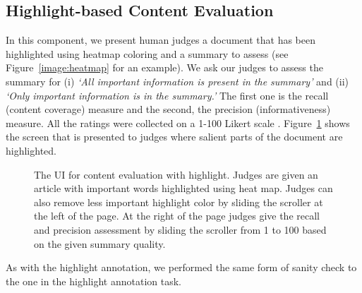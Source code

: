 \documentclass[11pt,a4paper]{article}
\begin{document}
\subsection{Highlight-based Content Evaluation}
In this component, we present human judges a document that has been highlighted using heatmap coloring and a summary to assess (see Figure~\ref{image:heatmap} for an example). We ask our judges to assess the summary for (i) \textit{`All important information is present in the summary'} and (ii) \textit{`Only important information is in the summary.'} The first one is the recall (content coverage) measure and the second, the precision (informativeness) measure. All the ratings were collected on a 1-100 Likert scale \citep{Likert1932}. Figure~\ref{image:highlightbasedevaluation} shows the screen that is presented to judges where salient parts of the document are highlighted.

\begin{figure}[h]
    \centering
    \label{image:highlightbasedevaluation}
    \caption{The UI for content evaluation with highlight. Judges are given an article with important words highlighted using heat map. Judges can also remove less important highlight color by sliding the scroller at the left of the page. At the right of the page judges give the recall and precision assessment by sliding the scroller from 1 to 100 based on the given summary quality.}
\end{figure}

As with the highlight annotation, %
we performed the same form of sanity check to the one in the highlight annotation task.
\end{document}
